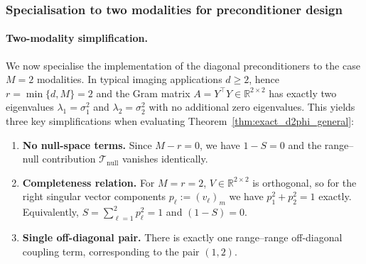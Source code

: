 \subsubsection{Specialisation to two modalities for preconditioner design}

\paragraph{Two-modality simplification.}
We now specialise the implementation of the diagonal preconditioners to the case $M = 2$ modalities.  In typical imaging applications $d\geq 2$, hence $r=\min\{d,M\}=2$ and the Gram matrix $A=Y^\top Y\in\mathbb{R}^{2\times 2}$ has exactly two eigenvalues $\lambda_1=\sigma_1^2$ and $\lambda_2=\sigma_2^2$ with no additional zero eigenvalues.  This yields three key simplifications when evaluating Theorem~\ref{thm:exact_d2phi_general}:
\begin{enumerate}
    \item \textbf{No null-space terms.} Since $M-r=0$, we have $1-S=0$ and the range--null contribution $\mathcal{T}_{\mathrm{null}}$ vanishes identically.
    \item \textbf{Completeness relation.} For $M=r=2$, $V\in\mathbb{R}^{2\times 2}$ is orthogonal, so for the right singular vector components $p_{\ell}:=(v_{\ell})_m$ we have $p_1^2+p_2^2=1$ exactly. Equivalently, $S=\sum_{\ell=1}^2 p_\ell^2=1$ and $(1-S)=0$.
    \item \textbf{Single off-diagonal pair.} There is exactly one range--range off-diagonal coupling term, corresponding to the pair $(1,2)$.
\end{enumerate}

